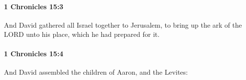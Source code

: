 		\paragraph{1 Chronicles 15:3} %
			\label{1CHRONICLES-15-3}

			And David gathered all Israel together to Jerusalem, to bring up the ark of the LORD unto his place, which he had prepared for it.


		\paragraph{1 Chronicles 15:4} %
			\label{1CHRONICLES-15-4}

			And David assembled the children of Aaron, and the Levites:


